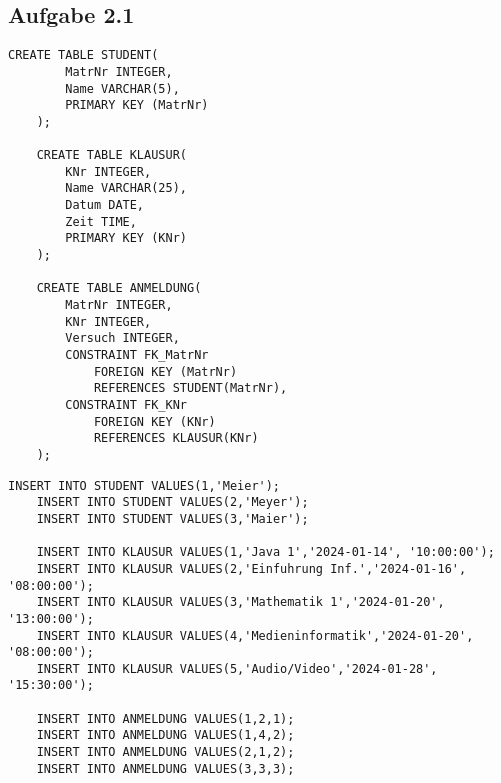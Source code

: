 \subsection{Aufgabe 2.1}
    \begin{lstlisting}[style=sqlstyle, caption={Erstellen der Tabellen STUDENT, KLAUSUR und ANMELDUNG}]
    CREATE TABLE STUDENT(
        MatrNr INTEGER,
        Name VARCHAR(5),
        PRIMARY KEY (MatrNr)
    );

    CREATE TABLE KLAUSUR(
        KNr INTEGER,
        Name VARCHAR(25),
        Datum DATE,
        Zeit TIME,
        PRIMARY KEY (KNr)
    );

    CREATE TABLE ANMELDUNG(
        MatrNr INTEGER,
        KNr INTEGER,
        Versuch INTEGER,
        CONSTRAINT FK_MatrNr
            FOREIGN KEY (MatrNr)
            REFERENCES STUDENT(MatrNr),
        CONSTRAINT FK_KNr
            FOREIGN KEY (KNr)
            REFERENCES KLAUSUR(KNr)
    );
    \end{lstlisting}
    
    \vspace{1cm}
    \begin{lstlisting}[style=sqlstyle, caption={Einfügen von Datensätzen in die Tabellen STUDENT, KLAUSUR und ANMELDUNG}]
    INSERT INTO STUDENT VALUES(1,'Meier');
    INSERT INTO STUDENT VALUES(2,'Meyer');
    INSERT INTO STUDENT VALUES(3,'Maier');

    INSERT INTO KLAUSUR VALUES(1,'Java 1','2024-01-14', '10:00:00');
    INSERT INTO KLAUSUR VALUES(2,'Einfuhrung Inf.','2024-01-16', '08:00:00');
    INSERT INTO KLAUSUR VALUES(3,'Mathematik 1','2024-01-20', '13:00:00');
    INSERT INTO KLAUSUR VALUES(4,'Medieninformatik','2024-01-20', '08:00:00');
    INSERT INTO KLAUSUR VALUES(5,'Audio/Video','2024-01-28', '15:30:00');

    INSERT INTO ANMELDUNG VALUES(1,2,1);
    INSERT INTO ANMELDUNG VALUES(1,4,2);
    INSERT INTO ANMELDUNG VALUES(2,1,2);
    INSERT INTO ANMELDUNG VALUES(3,3,3);
    \end{lstlisting}

